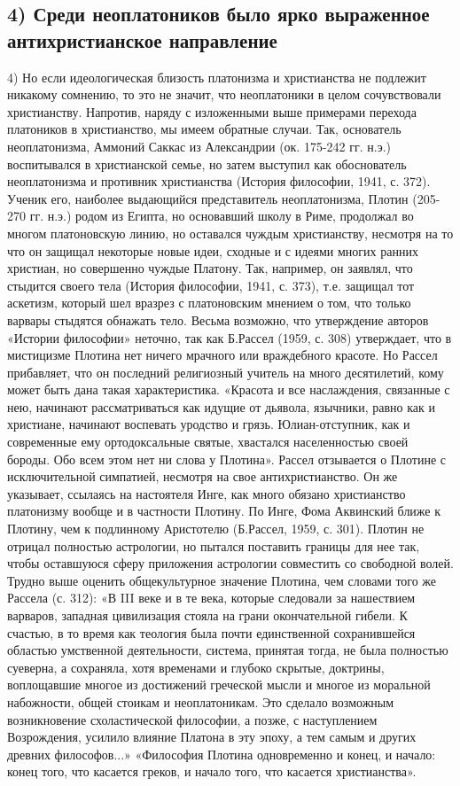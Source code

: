 \subsection{4) Среди неоплатоников было ярко выраженное
антихристианское направление}

4) Но если идеологическая близость платонизма и христианства не
подлежит никакому сомнению, то это не значит, что неоплатоники в целом
сочувствовали христианству. Напротив, наряду с изложенными выше
примерами перехода платоников в христианство, мы имеем обратные
случаи. Так, основатель неоплатонизма, Аммоний Саккас из Александрии
(ок. 175-242 гг. н.э.) воспитывался в христианской семье, но затем
выступил как обоснователь неоплатонизма и противник христианства
(История философии, 1941, с. 372). Ученик его, наиболее выдающийся
представитель неоплатонизма, Плотин (205-270 гг. н.э.) родом из
Египта, но основавший школу в Риме, продолжал во многом платоновскую
линию, но оставался чуждым христианству, несмотря на то что он защищал
некоторые новые идеи, сходные и с идеями многих ранних христиан, но
совершенно чуждые Платону. Так, например, он заявлял, что стыдится
своего тела (История философии, 1941, с. 373), т.е. защищал тот
аскетизм, который шел вразрез с платоновским мнением о том, что только
варвары стыдятся обнажать тело. Весьма возможно, что утверждение
авторов «Истории философии» неточно, так как Б.Рассел (1959, с. 308)
утверждает, что в мистицизме Плотина нет ничего мрачного или
враждебного красоте. Но Рассел прибавляет, что он последний
религиозный учитель на много десятилетий, кому может быть дана такая
характеристика. «Красота и все наслаждения, связанные с нею, начинают
рассматриваться как идущие от дьявола, язычники, равно как и
христиане, начинают воспевать уродство и грязь. Юлиан-отступник, как и
современные ему ортодоксальные святые, хвастался населенностью своей
бороды. Обо всем этом нет ни слова у Плотина». Рассел отзывается о
Плотине с исключительной симпатией, несмотря на свое антихристианство.
Он же указывает, ссылаясь на настоятеля Инге, как много обязано
христианство платонизму вообще и в частности Плотину. По Инге, Фома
Аквинский ближе к Плотину, чем к подлинному Аристотелю (Б.Рассел,
1959, с. 301). Плотин не отрицал полностью астрологии, но пытался
поставить границы для нее так, чтобы оставшуюся сферу приложения
астрологии совместить со свободной волей. Трудно выше оценить
общекультурное значение Плотина, чем словами того же Рассела (с. 312):
«В III веке и в те века, которые следовали за нашествием варваров,
западная цивилизация стояла на грани окончательной гибели. К счастью,
в то время как теология была почти единственной сохранившейся областью
умственной деятельности, система, принятая тогда, не была полностью
суеверна, а сохраняла, хотя временами и глубоко скрытые, доктрины,
воплощавшие многое из достижений греческой мысли и многое из моральной
набожности, общей стоикам и неоплатоникам. Это сделало возможным
возникновение схоластической философии, а позже, с наступлением
Возрождения, усилило влияние Платона в эту эпоху, а тем самым и других
древних философов...» «Философия Плотина одновременно и конец, и
начало: конец того, что касается греков, и начало того, что касается
христианства».

